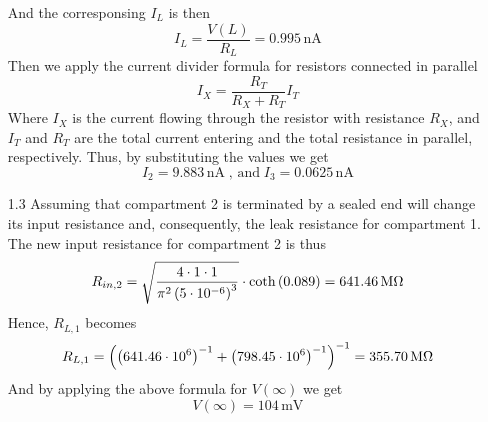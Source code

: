 \documentclass[12pt]{article}
\begin{document}
\begin{enumerate}
    And the corresponsing $I_L$ is then
    $$I_L = \frac{V(L)}{R_{L}} = 0.995 \, \text{nA}$$
    Then we apply the current divider formula for resistors connected in parallel
    $$I_{X} = \frac{R_{T}}{R_{X} + R_{T}}I_{T}$$
    Where $I_{X}$ is the current flowing through the resistor with resistance $R_{X}$, and $I_{T}$ and $R_{T}$ are the total current entering and the total resistance in parallel, respectively.
    Thus, by substituting the values we get\\
    $$I_{2} = 9.883 \, \text{nA} \; \text{, and} \; I_{3} = 0.0625 \, \text{nA}$$
    \item[1.3] Assuming that compartment 2 is terminated by a sealed end will change its input resistance and, consequently, the leak resistance for compartment 1. The new input resistance for compartment 2 is thus
    $$R_{in,2} = \sqrt{\frac{4\cdot 1\cdot 1}{\pi^{2}\left(5\cdot 10^{-6}\right)^{3}}}\cdot \text{coth}\left(0.089\right) = 641.46 \, \text{M\si{\ohm}}$$
    Hence, $R_{L, 1}$ becomes
    $$R_{L,1} = \left(\left(641.46\cdot 10^{6}\right)^{-1} + \left(798.45\cdot 10^{6}\right)^{-1}\right)^{-1} = 355.70 \, \text{M\si{\ohm}}$$
    And by applying the above formula for $V(\infty)$ we get 
    $$V(\infty) = 104 \, \text{mV}$$
\end{enumerate}
\end{document}
